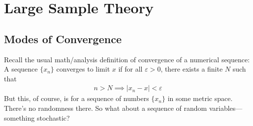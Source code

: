 \documentclass[12pt]{article}
\theoremstyle{plain}
\theoremstyle{definition}
\theoremstyle{remark}
\begin{document}




\clearpage
\section{Large Sample Theory}


\subsection{Modes of Convergence}

Recall the usual math/analysis definition of convergence of a numerical
sequence: A sequence $\{x_n\}$ converges to limit $x$ if for all
$\varepsilon> 0$, there exists a finite $N$ such that
\begin{align*}
  n > N \implies |x_n - x| < \varepsilon
\end{align*}
But this, of course, is for a sequence of numbers $\{x_n\}$ in some
metric space. There's no randomness there. So what about a sequence of
random variables---something stochastic?
\end{document}

